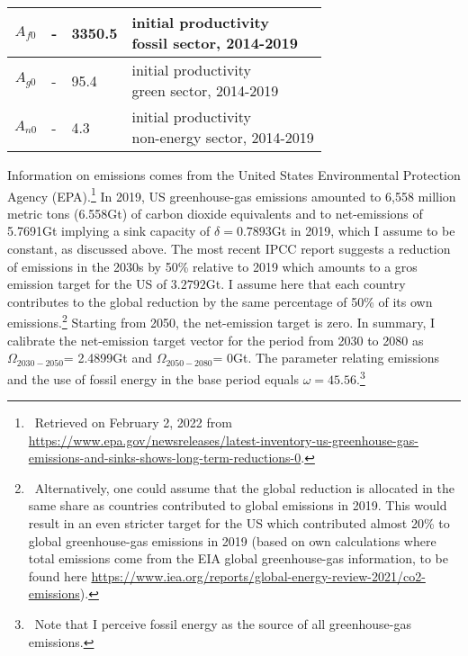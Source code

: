 \begin{table}[h!]
\begin{center}
\begin{tabular}{c|lll}
 			\hline
 			$A_{f0}$&- &3350.5& \makecell[l]{initial productivity \\ fossil sector, 2014-2019}  \\
 			\hline
 			$A_{g0}$&- &95.4& \makecell[l]{initial productivity \\ green sector, 2014-2019}  \\
 			\hline
 			$A_{n0}$&- &4.3& \makecell[l]{initial productivity \\ non-energy sector, 2014-2019}  \\
 			\hline \hline
 		\end{tabular}
 	\end{center}
 \end{table}
 \clearpage
 
 Information on emissions comes from the United States Environmental Protection Agency (EPA).\footnote{\ Retrieved on February 2, 2022 from  \url{https://www.epa.gov/newsreleases/latest-inventory-us-greenhouse-gas-emissions-and-sinks-shows-long-term-reductions-0}. } In 2019, US greenhouse-gas emissions amounted to 6,558 million metric tons (6.558Gt) of carbon dioxide equivalents and to net-emissions of 5.7691Gt implying a sink capacity of $\delta=0.7893$Gt in 2019, which I assume to be constant, as discussed above. %
 The most recent IPCC report \citep{IPCC2022} suggests a reduction of emissions in the 2030s by 50\% relative to 2019 which amounts to a gros emission target for the US of  $3.2792$Gt. I assume here that each country contributes to the global reduction by the same percentage of 50\% of its own emissions.\footnote{\ Alternatively, one could assume that the global reduction is allocated in the same share as countries contributed to global emissions in 2019. This would result in an even stricter target for the US which contributed almost 20\% to global greenhouse-gas emissions in 2019 (based on own calculations where total emissions come from the EIA global greenhouse-gas information, to be found here \url{https://www.iea.org/reports/global-energy-review-2021/co2-emissions}).}
 Starting from 2050, the net-emission target is zero. In summary, I calibrate the net-emission target vector for the period from 2030 to 2080 as
 $\Omega_{2030-2050}$= 2.4899Gt and $\Omega_{2050-2080}$= 0Gt. The parameter relating emissions and the use of fossil energy in the base period equals $\omega=45.56$.\footnote{\ Note that I perceive fossil energy as the source of all greenhouse-gas emissions.}  
 \clearpage

